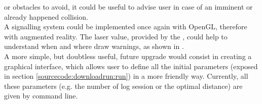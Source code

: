 or obstacles to avoid, it could be useful to advise user in case 
of an imminent or already happened collision.
\\
A signalling system could be implemented once again with OpenGL, therefore 
with augmented reality. The laser value, provided by the \morduc{},
could help to understand when and where draw warnings, as shown in 
\cite{morduc:macalusodetommaso}.
\\
A more simple, but doubtless useful, future upgrade would consist in 
creating a graphical interface, which allows user to define all the initial
parameters (exposed in section \ref{sourcecode:downloadrun:run})
in a more friendly way. 
Currently, all these parameters (e.g. the number of log session or the 
optimal distance) are given by command line.
